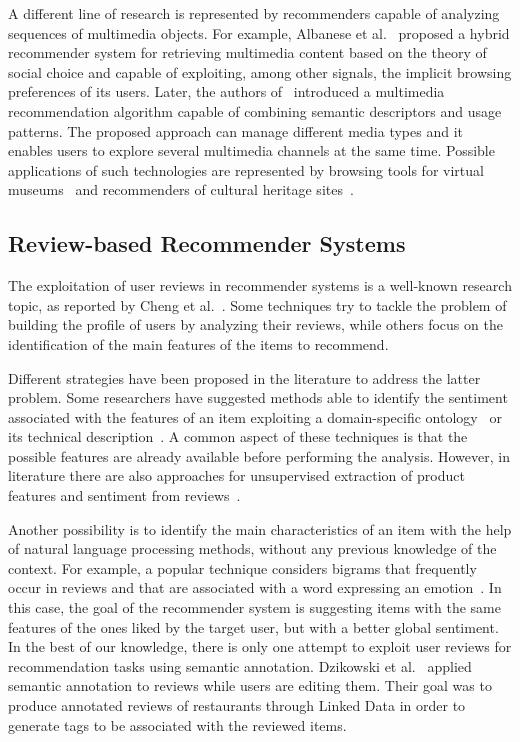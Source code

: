A different line of research is represented by recommenders capable of analyzing sequences of multimedia objects. For example, Albanese et al.~\cite{Albanese2010} proposed a hybrid recommender system for retrieving multimedia content based on the theory of social choice and capable of exploiting, among other signals, the implicit browsing preferences of its users. Later, the authors of~\cite{Albanese2013} introduced a multimedia recommendation algorithm capable of combining semantic descriptors and usage patterns. The proposed approach can manage different media types and it enables users to explore several multimedia channels at the same time. Possible applications of such technologies are represented by browsing tools for virtual museums~\cite{Amato2017} and recommenders of cultural heritage sites~\cite{Su2019}.

\subsection{Review-based Recommender Systems}
\label{soa:sec:review-rs}

The exploitation of user reviews in recommender systems is a well-known research topic, as reported by Cheng et al.~\cite{Chen2015}. Some techniques try to tackle the problem of building the profile of users by analyzing their reviews, while others focus on the identification of the main features of the items to recommend.

Different strategies have been proposed in the literature to address the latter problem. Some researchers have suggested methods able to identify the sentiment associated with the features of an item exploiting a domain-specific ontology~\cite{Aciar2007} or its technical description~\cite{Yates2008}. A common aspect of these techniques is that the possible features are already available before performing the analysis. However, in literature there are also approaches for unsupervised extraction of product features and sentiment from reviews~\cite{Qiu2011, Somprasertsri2010}.

Another possibility is to identify the main characteristics of an item with the help of natural language processing methods, without any previous knowledge of the context. For example, a popular technique considers bigrams that frequently occur in reviews and that are associated with a word expressing an emotion~\cite{Dong2013}. In this case, the goal of the recommender system is suggesting items with the same features of the ones liked by the target user, but with a better global sentiment. In the best of our knowledge, there is only one attempt to exploit user reviews for recommendation tasks using semantic annotation. Dzikowski et al.~\cite{Dzikowski2012} applied semantic annotation to reviews while users are editing them. Their goal was to produce annotated reviews of restaurants through Linked Data in order to generate tags to be associated with the reviewed items.

